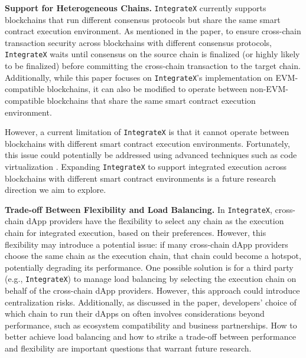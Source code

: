 \vspace{3pt}
\noindent
\textbf{Support for Heterogeneous Chains.} 
\texttt{IntegrateX} currently supports blockchains that run different consensus protocols but share the same smart contract execution environment. 
As mentioned in the paper, to ensure cross-chain transaction security across blockchains with different consensus protocols, \texttt{IntegrateX} waits until consensus on the source chain is finalized (or highly likely to be finalized) before committing the cross-chain transaction to the target chain. 
Additionally, while this paper focuses on \texttt{IntegrateX}’s implementation on EVM-compatible blockchains, it can also be modified to operate between non-EVM-compatible blockchains that share the same smart contract execution environment.

However, a current limitation of \texttt{IntegrateX} is that it cannot operate between blockchains with different smart contract execution environments. 
Fortunately, this issue could potentially be addressed using advanced techniques such as code virtualization \cite{virtualization}. 
Expanding \texttt{IntegrateX} to support integrated execution across blockchains with different smart contract environments is a future research direction we aim to explore.

\vspace{3pt}
\noindent
\textbf{Trade-off Between Flexibility and Load Balancing.} 
In \texttt{IntegrateX}, cross-chain dApp providers have the flexibility to select any chain as the execution chain for integrated execution, based on their preferences. 
However, this flexibility may introduce a potential issue: if many cross-chain dApp providers choose the same chain as the execution chain, that chain could become a hotspot, potentially degrading its performance.
One possible solution is for a third party (e.g., \texttt{IntegrateX}) to manage load balancing by selecting the execution chain on behalf of the cross-chain dApp providers. 
However, this approach could introduce centralization risks. 
Additionally, as discussed in the paper, developers' choice of which chain to run their dApps on often involves considerations beyond performance, such as ecosystem compatibility and business partnerships.
How to better achieve load balancing and how to strike a trade-off between performance and flexibility are important questions that warrant future research.

